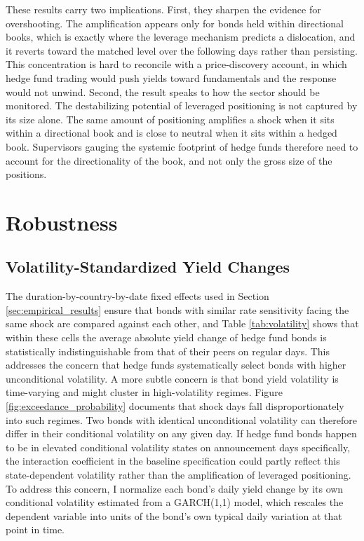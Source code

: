\documentclass[english, 11pt, oneside]{article}
\begin{document}
These results carry two implications. First, they sharpen the evidence for overshooting. The amplification appears only for bonds held within directional books, which is exactly where the leverage mechanism predicts a dislocation, and it reverts toward the matched level over the following days rather than persisting. This concentration is hard to reconcile with a price-discovery account, in which hedge fund trading would push yields toward fundamentals and the response would not unwind. Second, the result speaks to how the sector should be monitored. The destabilizing potential of leveraged positioning is not captured by its size alone. The same amount of positioning amplifies a shock when it sits within a directional book and is close to neutral when it sits within a hedged book. Supervisors gauging the systemic footprint of hedge funds therefore need to account for the directionality of the book, and not only the gross size of the positions.


\section{Robustness}
\label{sec:robustness_main}
\subsection{Volatility-Standardized Yield Changes}
\label{subsec:GARCH}

The duration-by-country-by-date fixed effects used in Section \ref{sec:empirical_results} ensure that bonds with similar rate sensitivity facing the same shock are compared against each other, and Table \ref{tab:volatility} shows that within these cells the average absolute yield change of hedge fund bonds is statistically indistinguishable from that of their peers on regular days. This addresses the concern that hedge funds systematically select bonds with higher unconditional volatility. A more subtle concern is that bond yield volatility is time-varying and might cluster in high-volatility regimes. Figure \ref{fig:exceedance_probability} documents that shock days fall disproportionately into such regimes. Two bonds with identical unconditional volatility can therefore differ in their conditional volatility on any given day. If hedge fund bonds happen to be in elevated conditional volatility states on announcement days specifically, the interaction coefficient in the baseline specification could partly reflect this state-dependent volatility rather than the amplification of leveraged positioning. To address this concern, I normalize each bond's daily yield change by its own conditional volatility estimated from a GARCH(1,1) model, which rescales the dependent variable into units of the bond's own typical daily variation at that point in time.
\end{document}
